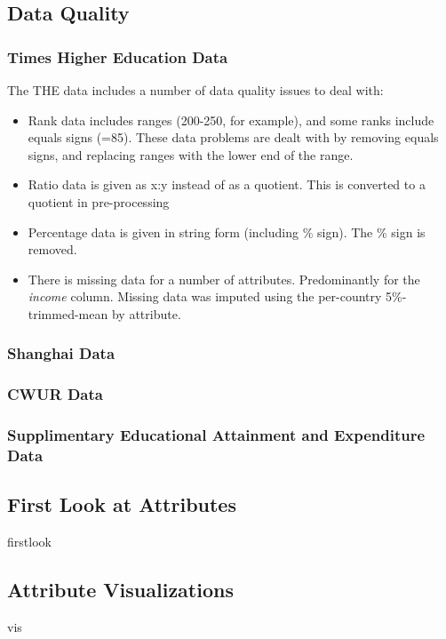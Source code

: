\documentclass[12pt]{article}
\begin{document}
\subsection{Data Quality}

\subsubsection{Times Higher Education Data}
The THE data includes a number of data quality issues to deal with:
\begin{itemize}
\item Rank data includes ranges (200-250, for example), and some ranks include equals signs (=85). These data problems are dealt with by removing equals signs, and replacing ranges with the lower end of the range.
\item Ratio data is given as x:y instead of as a quotient. This is converted to a quotient in pre-processing
\item Percentage data is given in string form (including \% sign). The \% sign is removed.
\item There is missing data for a number of attributes. Predominantly for the \textit{income} column. Missing data was imputed using the per-country 5\%-trimmed-mean by attribute.
\end{itemize}

\subsubsection{Shanghai Data}

\subsubsection{CWUR Data}

\subsubsection{Supplimentary Educational Attainment and Expenditure Data}

\subsection{First Look at Attributes}
firstlook

\subsection{Attribute Visualizations}
vis
\end{document}
